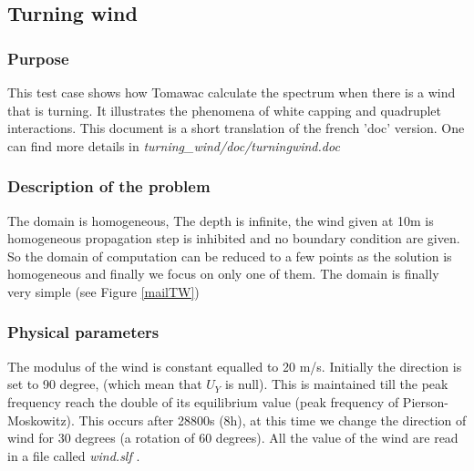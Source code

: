 \subsection{Turning wind}
%

%
\subsubsection{Purpose}
%
This test case shows how Tomawac calculate the spectrum when there is a wind that is turning. It illustrates the phenomena of white capping and quadruplet interactions.  This document is a short translation of the french 'doc' version. One can find more details in {\it turning\_wind/doc/turningwind.doc}

%
\subsubsection{Description of the problem}
%
The domain is homogeneous, The depth is infinite, the wind given at 10m is homogeneous  propagation step is inhibited and no boundary condition are given.
So the domain of computation can be reduced to a few points as the solution is homogeneous and finally we focus on only one of them. The domain is finally very simple (see Figure \ref{mailTW})


%
%
\subsubsection{Physical parameters}
%
The modulus of the wind is constant equalled to 20 m/s. Initially the direction is set to 90 degree, (which mean that $U_Y$ is null). This is maintained till the peak frequency reach the double of its equilibrium value (peak frequency of Pierson-Moskowitz). This occurs after 28800s (8h), at this time we change the direction of wind for 30 degrees (a rotation of 60 degrees). All the value of the wind are read in a file called {\it wind.slf   }.
%
%
